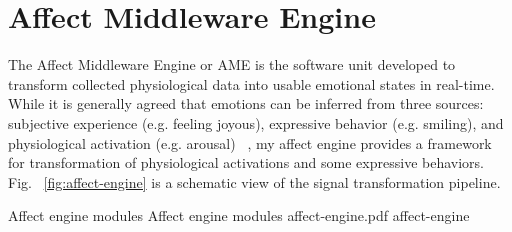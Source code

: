 
\section{Affect Middleware Engine}

The Affect Middleware Engine or AME is the software unit developed to transform collected physiological data into usable emotional states in real-time. While it is generally agreed that emotions can be inferred from three sources: subjective experience (e.g. feeling joyous), expressive behavior (e.g. smiling), and physiological activation (e.g. arousal) ~\cite{scherer1993neuroscience}, my affect engine provides a framework for transformation of physiological activations and some expressive behaviors. Fig. ~\ref{fig:affect-engine} is a schematic view of the signal transformation pipeline.

\img
{Affect engine modules}
{Affect engine modules}
{affect-engine.pdf}
{affect-engine}


